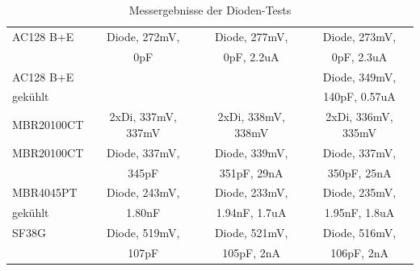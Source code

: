 \begin{table}[H]
\begin{center}
\begin{tabular}{| l | c | c | c |}
    \hline
AC128 B+E  & Diode, 272mV,        & Diode, 277mV,              & Diode, 273mV,             \\
           &               0pF    &               0pF, 2.2uA   &               0pF, 2.3uA  \\
    \hline
AC128 B+E  &                      &                     & Diode, 349mV,               \\
gekühlt    &                      &                     &               140pF, 0.57uA \\
    \hline
MBR20100CT & 2xDi, 337mV, 337mV   & 2xDi, 338mV, 338mV  & 2xDi, 336mV, 335mV  \\
    \hline
MBR20100CT & Diode, 337mV,        & Diode, 339mV,             & Diode, 337mV,            \\
           &               345pF  &               351pF, 29nA &               350pF, 25nA\\
    \hline
MBR4045PT  & Diode, 243mV,        & Diode, 233mV,               & Diode, 235mV,              \\
gekühlt    &               1.80nF &               1.94nF, 1.7uA &               1.95nF, 1.8uA\\
    \hline
SF38G      & Diode, 519mV,        & Diode, 521mV,            & Diode, 516mV,            \\
           &               107pF  &               105pF, 2nA &               106pF, 2nA \\
    \hline
    \end{tabular}
  \end{center}
  \caption{Messergebnisse der Dioden-Tests}
  \label{tab:diodes} 
\end{table}

